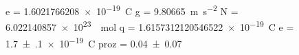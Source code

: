 e = \SI[]{1.6021766208e-19}{\coulomb}
g = \SI[]{9.80665}{\meter\per\second\squared}
N = \SI[]{6.022140857e+23}{\per\mole}
q = \SI[]{1.6157312120546522e-19}{\coulomb}
e = \SI{+1.7(1)e-19}{\coulomb}
proz = \SI{+0.04(7)}{}
